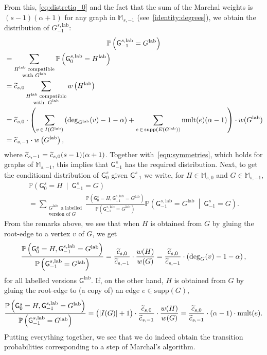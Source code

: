 \documentclass[AHL,Unicode,longabstracts,published]{cedram}
\newcommand{\Pp}[1]{\mathbb{P} \left(#1\right)}
\newcommand{\supp}{\mathrm{supp}}
\newcommand{\lab}{\mathrm{lab}}
\newcommand{\mult}{\mathrm{mult}}
\newcommand{\sG}{\mathsf{G}}
\newcommand{\M}{\mathbb{M}}
\let\oldtilde\tilde
\renewcommand*{\tilde}[1]{\mathchoice{\widetilde{#1}}{\widetilde{#1}}{\oldtilde{#1}}{\oldtilde{#1}}}
\begin{document}
From this, \eqref{eq:distretiq_0} and the fact that the sum of the Marchal weights is $(s-1)(\alpha+1)$ for any graph in $\M_{s,-1}$ (see~\eqref{identity:degrees}), we obtain the distribution of $G_{-1}^{s,\lab}$:
\begin{multline*}
\Pp{\sG_{-1}^{s,\lab}=G^{\lab}}\\
\begin{aligned}
&=\sum_{\substack{H^{\lab}\; \text{compatible} \\ \text{with }G^{\lab}}} \Pp{\sG_{0}^{s,\lab}=H^{\lab}} \\
& = \tilde{c}_{s,0}\sum_{\substack{H^{\lab}\; \text{compatible} \\ \text{with }\;G^{\lab}}} w\left(H^{\lab}\right) \\
&= \tilde{c}_{s,0} \cdot \left(\sum_{v\,\in\, I\left(G^{\lab}\right)} \left(\deg_{G^{\lab}}(v)-1-\alpha\right) + \sum_{e\,\in\,\supp\left(E\left(G^{\lab}\right)\right)} \mult(e)(\alpha-1) \right) \cdot w(G^{\lab}) \\
&= \tilde{c}_{s,-1} \cdot w\left(G^{\lab}\right),
\end{aligned}
\end{multline*}
where $\tilde{c}_{s,-1}=\tilde{c}_{s,0}(s-1)(\alpha+1)$. Together with~\eqref{eqn:symmetries}, which holds for graphs of $\M_{s,-1}$, this implies that $\sG_{-1}^s$ has the required distribution. Next, to get the conditional distribution of $\sG^s_0$ given $\sG^s_{-1}$ we write, for $H \in \M_{s,0}$ and $G \in \M_{s,-1}$,
\begin{multline*}
\Pp{\sG^s_0 =H \ \middle| \ \sG^s_{-1} =G}\\
 = \sum_{\substack{G^{\lab}\;\text{ a labelled} \\ \text{version of $G$}}} \frac{\Pp{\sG^s_0 =H, \sG^{s,\lab}_{-1} =G^{\lab}}}{\Pp {\sG^{s,\lab}_{-1} =G^{\lab}}} \Pp{\sG^{s,\lab}_{-1} =G^{\lab} \ \middle| \ \sG^s_{-1} =G}.
\end{multline*}
From the remarks above, we see that when $H$ is obtained from $G$ by gluing the root-edge to a vertex $v$ of $G$, we get
\[
\frac{\Pp{\sG^s_0 =H, \sG^{s,\lab}_{-1} =G^{\lab}}}{\Pp{ \sG^{s,\lab}_{-1} =G^{\lab}}} = \frac{\tilde{c}_{s,0}}{\tilde{c}_{s,-1}} \cdot \frac{w(H)}{w(G)}=\frac{\tilde{c}_{s,0}}{\tilde{c}_{s,-1}} \cdot \left(\deg_G(v)-1-\alpha\right),
\]
for all labelled versions $\sG^{\lab}$. If, on the other hand, $H$ is obtained from $G$ by gluing the root-edge to (a copy of) an edge $e \in \supp(G)$,
\[
\frac{\Pp{\sG^s_0 =H, \sG^{s,\lab}_{-1} =G^{\lab}}}{\Pp{ \sG^{s,\lab}_{-1} =G^{\lab}}} =\big(|I(G)|+1\big) \cdot \frac{\tilde{c}_{s,0}}{\tilde{c}_{s,-1}} \cdot \frac{w(H)}{w(G)}=\frac{\tilde{c}_{s,0}}{\tilde{c}_{s,-1}} \cdot (\alpha-1) \cdot \mult(e).
\]
Putting everything together, we see that we do indeed obtain the transition probabilities corresponding to a step of Marchal's algorithm.
\end{document}
